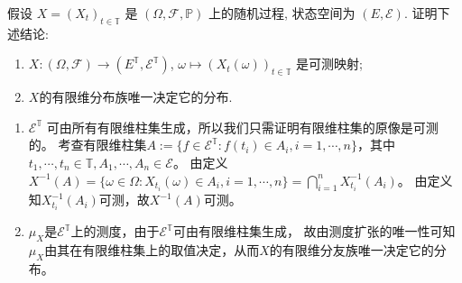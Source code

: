 \documentclass{ctexart}
\newif\ifpreface
\begin{document}
\large
\setlength{\baselineskip}{1.2em}
\ifpreface

\newgeometry{left=2cm,right=2cm,top=2cm,bottom=2cm}
\else
{}
\maketitle
\fi
\begin{problem}\label{pro:1}
  假设 \(X = (X_t)_{t∈\mathbb{T}}\) 是 \((\Omega, \mathcal{F}, \mathbb{P})\) 上的随机过程, 状态空间为 \((E, \mathcal{E} )\). 证明下述结论:
  \begin{enumerate}
    \item \(X : (\Omega, \mathcal{F}) → (E^{\mathbb{T}}, \mathcal{E}^{\mathbb{T}})\), \(\omega \mapsto (X_t(\omega))_{ t \in \mathbb{T} }\) 是可测映射;
    \item \(X \)的有限维分布族唯一决定它的分布.
  \end{enumerate}
\end{problem}
\begin{solution}
  \begin{enumerate}
    \item \(\mathcal{E}^{\mathbb{T}} \) 可由所有有限维柱集生成，所以我们只需证明有限维柱集的原像是可测的。
      考查有限维柱集\(A:= \{f \in \mathcal{E}^{\mathbb{T}}: f(t_i)\in A_i,i=1,\cdots,n\} \)，其中\(t_{1},\cdots,t_n \in \mathbb{T},A_{1},\cdots,A_n \in \mathcal{E} \)。
      由定义\(X^{-1}(A) = \{\omega \in \Omega: X_{t_i}(\omega) \in A_i,i=1,\cdots,n\} = \bigcap_{i=1}^{n}X_{t_i}^{-1}(A_i) \)。
      由定义知\(X_{t_i}^{-1}(A_i) \)可测，故\(X^{-1}(A) \)可测。
    \item \(\mu_X \)是\(\mathcal{E}^{\mathbb{T}} \)上的测度，由于\(\mathcal{E}^{\mathbb{T}} \)可由有限维柱集生成，
      故由测度扩张的唯一性可知\(\mu_X \)由其在有限维柱集上的取值决定，从而\(X \)的有限维分友族唯一决定它的分布。
  \end{enumerate}
\end{solution}
\end{document}
